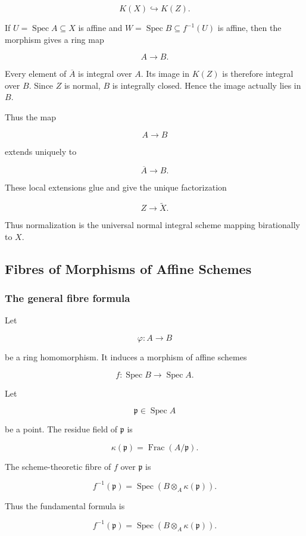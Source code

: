 \documentclass[12pt,a4paper]{article}
\theoremstyle{notespace}
\begin{document}
\[
K(X)\hookrightarrow K(Z).
\]

If \(U=\operatorname{Spec}A\subseteq X\) is affine and \(W=\operatorname{Spec}B\subseteq f^{-1}(U)\) is affine, then the morphism gives a ring map

\[
A\to B.
\]

Every element of \(\overline{A}\) is integral over \(A\). Its image in \(K(Z)\) is therefore integral over \(B\). Since \(Z\) is normal, \(B\) is integrally closed. Hence the image actually lies in \(B\).

Thus the map

\[
A\to B
\]

extends uniquely to

\[
\overline{A}\to B.
\]

These local extensions glue and give the unique factorization

\[
Z\to \widetilde{X}.
\]

Thus normalization is the universal normal integral scheme mapping birationally to \(X\).

\subsection{Fibres of Morphisms of Affine Schemes}

\subsubsection{The general fibre formula}

Let

\[
\varphi:A\to B
\]

be a ring homomorphism. It induces a morphism of affine schemes

\[
f:\operatorname{Spec}B\to \operatorname{Spec}A.
\]

Let

\[
\mathfrak{p}\in \operatorname{Spec}A
\]

be a point. The residue field of \(\mathfrak{p}\) is

\[
\kappa(\mathfrak{p})
=
\operatorname{Frac}(A/\mathfrak{p}).
\]

The scheme-theoretic fibre of \(f\) over \(\mathfrak{p}\) is

\[
f^{-1}(\mathfrak{p})
=
\operatorname{Spec}\left(B\otimes_A \kappa(\mathfrak{p})\right).
\]

Thus the fundamental formula is

\[
\boxed{
	f^{-1}(\mathfrak{p})
	=
	\operatorname{Spec}\left(B\otimes_A \kappa(\mathfrak{p})\right).
}
\]
\end{document}
